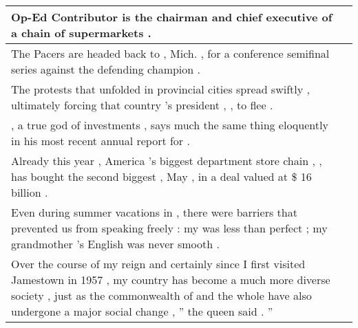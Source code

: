 \begin{table}
\begin{tabular}{p{} P{1,3cm} }
\hline
{} {Op-Ed Contributor \underline{} is the chairman and chief executive of a chain of \underline{} supermarkets .} &    \\ 
\hline
{} {The Pacers are headed back to \underline{} , Mich. , for a conference semifinal series against the defending champion \underline{} .} &    \\ 
\hline
{} {The protests that unfolded in provincial \underline{} cities spread swiftly , ultimately forcing that country 's president , \underline{} , to flee .} &    \\ 
\hline
{} {\underline{} , a true god of investments , says much the same thing eloquently in his most recent annual report for \underline{} .} &    \\ 
\hline
{} {Already this year , America 's biggest department store chain , \underline{} , has bought the second biggest , May \underline{} , in a deal valued at \$ 16 billion .} &    \\ 
\hline
{} {Even during summer vacations in \underline{} , there were barriers that prevented us from speaking freely : my \underline{} was less than perfect ; my grandmother 's English was never smooth .} &    \\ 
\hline
{} {Over the course of my reign and certainly since I first visited Jamestown in 1957 , my country has become a much more diverse society , just as the commonwealth of \underline{} and the whole \underline{} have also undergone a major social change , '' the queen said . ''} &    \\ 
\hline


\end{tabular} 



\end{table}